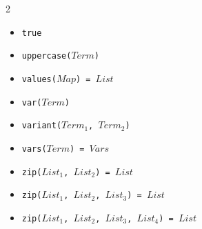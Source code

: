 \documentclass[10pt]{article}
\begin{document}
\begin{multicols}{2}
\begin{scriptsize}
\begin{itemize}
    \item \texttt{true}
    \item \texttt{uppercase($Term$)} 
    \item \texttt{values($Map$) = $List$} 
    \item \texttt{var($Term$)} 
    \item \texttt{variant($Term_1$, $Term_2$)}
    \item \texttt{vars($Term$) = $Vars$}
    \item \texttt{zip($List_1$, $List_2$) = $List$} 
    \item \texttt{zip($List_1$, $List_2$, $List_3$) = $List$} 
    \item \texttt{zip($List_1$, $List_2$, $List_3$, $List_4$) = $List$} 
\end{itemize}
\end{scriptsize}
%

\end{multicols}
\end{document}
